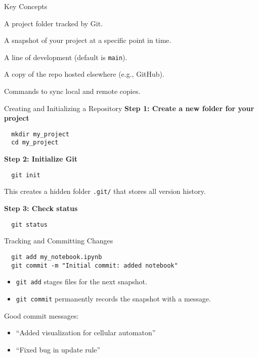 \documentclass[aspectratio=169,13pt]{beamer}
\begin{document}
\begin{frame}{Key Concepts}
    \begin{description}[leftmargin=1.5cm, labelwidth=2cm]
        \item[Repository (repo)] A project folder tracked by Git.
        \item[Commit] A snapshot of your project at a specific point in time.
        \item[Branch] A line of development (default is \texttt{main}).
        \item[Remote] A copy of the repo hosted elsewhere (e.g., GitHub).
        \item[Clone / Push / Pull] Commands to sync local and remote copies.
    \end{description}
\end{frame}

\begin{frame}[fragile]{Creating and Initializing a Repository}
    \textbf{Step 1: Create a new folder for your project}
    \begin{verbatim}
  mkdir my_project
  cd my_project
  \end{verbatim}

    \textbf{Step 2: Initialize Git}
    \begin{verbatim}
  git init
  \end{verbatim}

    This creates a hidden folder \texttt{.git/} that stores all version history.

    \textbf{Step 3: Check status}
    \begin{verbatim}
  git status
  \end{verbatim}
\end{frame}

\begin{frame}[fragile]{Tracking and Committing Changes}
    \begin{verbatim}
  git add my_notebook.ipynb
  git commit -m "Initial commit: added notebook"
  \end{verbatim}

    \begin{itemize}
        \item \texttt{git add} stages files for the next snapshot.
        \item \texttt{git commit} permanently records the snapshot with a message.
    \end{itemize}

    \vspace{0.5em}
    Good commit messages:
    \begin{itemize}
        \item “Added visualization for cellular automaton”
        \item “Fixed bug in update rule”
    \end{itemize}
\end{frame}
\end{document}
